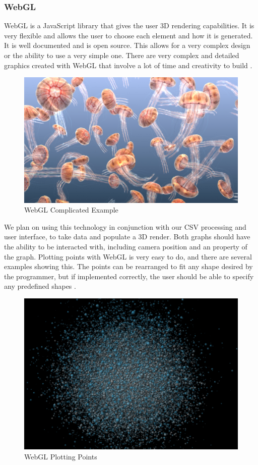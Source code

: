 \documentclass[journal,10pt,onecolumn,compsoc]{IEEEtran} \usepackage[margin=1.0in]{geometry} \usepackage{pdfpages}
\begin{document}
        \subsubsection{WebGL}
        WebGL is a JavaScript library that gives the user 3D rendering capabilities. It is very flexible and allows the user to choose each element and how it is generated. It is well documented and is open source. This allows for a very complex design or the ability to use a very simple one. There are very complex and detailed graphics created with WebGL that involve a lot of time and creativity to build \cite{Jellyfish}.
        \begin{figure}[H]
            \centering
                \includegraphics[width=\linewidth]{webgl_example_1.jpg}
                \caption{WebGL Complicated Example}
        \end{figure}
        We plan on using this technology in conjunction with our CSV processing and user interface, to take data and populate a 3D render. Both graphs should have the ability to be interacted with, including camera position and an property of the graph. Plotting points with WebGL is very easy to do, and there are several examples showing this. The points can be rearranged to fit any shape desired by the programmer, but if implemented correctly, the user should be able to specify any predefined shapes \cite{Plots}.
        \begin{figure}[H]
            \centering
                \includegraphics[width=\linewidth]{webgl_example_2.jpg}
                \caption{WebGL Plotting Points}
        \end{figure}
\end{document}
